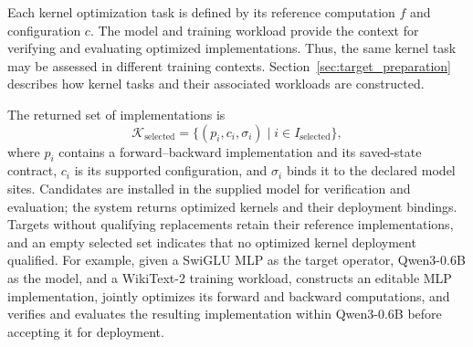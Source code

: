 Each kernel optimization task is defined by its reference computation $f$ and configuration $c$. The model and training workload provide the context for verifying and evaluating optimized implementations. Thus, the same kernel task may be assessed in different training contexts. Section~\ref{sec:target_preparation} describes how kernel tasks and their associated workloads are constructed.

The returned set of implementations is
\begin{equation}
    \mathcal K_{\mathrm{selected}}
    =\{(p_i,c_i,\sigma_i)\mid i\in I_{\mathrm{selected}}\},
    \label{eq:selected_kernels}
\end{equation}
where $p_i$ contains a forward--backward implementation and its saved-state contract, $c_i$ is its supported configuration, and $\sigma_i$ binds it to the declared model sites. 
Candidates are installed in the supplied model for verification and evaluation; the system returns optimized kernels and their deployment bindings. 
Targets without qualifying replacements retain their reference implementations, and an empty selected set indicates that no optimized kernel deployment qualified.
For example, given a SwiGLU MLP as the target operator, Qwen3-0.6B as the model, and a WikiText-2 training workload, \system constructs an editable MLP implementation, jointly optimizes its forward and backward computations, and verifies and evaluates the resulting implementation within Qwen3-0.6B before accepting it for deployment.

